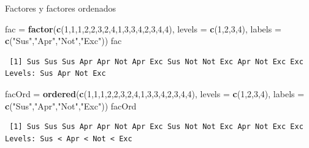 \documentclass[
  ignorenonframetext,
  aspectratio=169]{beamer}
\newenvironment{Shaded}{\begin{snugshade}}{\end{snugshade}}
\newcommand{\AttributeTok}[1]{\textcolor[rgb]{0.13,0.29,0.53}{#1}}
\newcommand{\DecValTok}[1]{\textcolor[rgb]{0.00,0.00,0.81}{#1}}
\newcommand{\FunctionTok}[1]{\textcolor[rgb]{0.13,0.29,0.53}{\textbf{#1}}}
\newcommand{\NormalTok}[1]{#1}
\newcommand{\OtherTok}[1]{\textcolor[rgb]{0.56,0.35,0.01}{#1}}
\newcommand{\StringTok}[1]{\textcolor[rgb]{0.31,0.60,0.02}{#1}}
\begin{document}
\begin{frame}[fragile]{Factores y factores ordenados}
\label{factores-y-factores-ordenados}
\begin{Shaded}
\begin{Highlighting}[]
\NormalTok{fac }\OtherTok{=} \FunctionTok{factor}\NormalTok{(}\FunctionTok{c}\NormalTok{(}\DecValTok{1}\NormalTok{,}\DecValTok{1}\NormalTok{,}\DecValTok{1}\NormalTok{,}\DecValTok{2}\NormalTok{,}\DecValTok{2}\NormalTok{,}\DecValTok{3}\NormalTok{,}\DecValTok{2}\NormalTok{,}\DecValTok{4}\NormalTok{,}\DecValTok{1}\NormalTok{,}\DecValTok{3}\NormalTok{,}\DecValTok{3}\NormalTok{,}\DecValTok{4}\NormalTok{,}\DecValTok{2}\NormalTok{,}\DecValTok{3}\NormalTok{,}\DecValTok{4}\NormalTok{,}\DecValTok{4}\NormalTok{), }
       \AttributeTok{levels =} \FunctionTok{c}\NormalTok{(}\DecValTok{1}\NormalTok{,}\DecValTok{2}\NormalTok{,}\DecValTok{3}\NormalTok{,}\DecValTok{4}\NormalTok{), }
       \AttributeTok{labels =} \FunctionTok{c}\NormalTok{(}\StringTok{"Sus"}\NormalTok{,}\StringTok{"Apr"}\NormalTok{,}\StringTok{"Not"}\NormalTok{,}\StringTok{"Exc"}\NormalTok{))}
\NormalTok{fac}
\end{Highlighting}
\end{Shaded}

\begin{verbatim}
 [1] Sus Sus Sus Apr Apr Not Apr Exc Sus Not Not Exc Apr Not Exc Exc
Levels: Sus Apr Not Exc
\end{verbatim}

\begin{Shaded}
\begin{Highlighting}[]
\NormalTok{facOrd }\OtherTok{=} \FunctionTok{ordered}\NormalTok{(}\FunctionTok{c}\NormalTok{(}\DecValTok{1}\NormalTok{,}\DecValTok{1}\NormalTok{,}\DecValTok{1}\NormalTok{,}\DecValTok{2}\NormalTok{,}\DecValTok{2}\NormalTok{,}\DecValTok{3}\NormalTok{,}\DecValTok{2}\NormalTok{,}\DecValTok{4}\NormalTok{,}\DecValTok{1}\NormalTok{,}\DecValTok{3}\NormalTok{,}\DecValTok{3}\NormalTok{,}\DecValTok{4}\NormalTok{,}\DecValTok{2}\NormalTok{,}\DecValTok{3}\NormalTok{,}\DecValTok{4}\NormalTok{,}\DecValTok{4}\NormalTok{), }
       \AttributeTok{levels =} \FunctionTok{c}\NormalTok{(}\DecValTok{1}\NormalTok{,}\DecValTok{2}\NormalTok{,}\DecValTok{3}\NormalTok{,}\DecValTok{4}\NormalTok{), }
       \AttributeTok{labels =} \FunctionTok{c}\NormalTok{(}\StringTok{"Sus"}\NormalTok{,}\StringTok{"Apr"}\NormalTok{,}\StringTok{"Not"}\NormalTok{,}\StringTok{"Exc"}\NormalTok{))}
\NormalTok{facOrd}
\end{Highlighting}
\end{Shaded}

\begin{verbatim}
 [1] Sus Sus Sus Apr Apr Not Apr Exc Sus Not Not Exc Apr Not Exc Exc
Levels: Sus < Apr < Not < Exc
\end{verbatim}
\end{frame}
\end{document}
